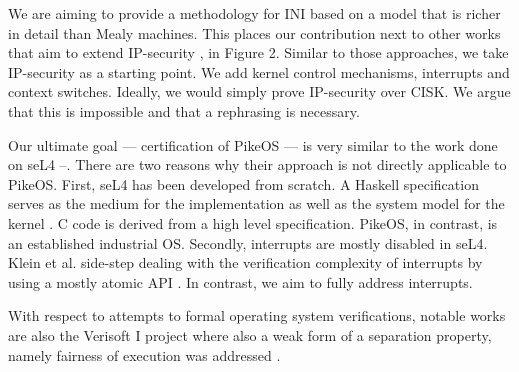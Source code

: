 \documentclass[11pt,a4paper]{article}
\begin{document}
We are aiming to provide a methodology for INI based on a model that is richer 
in detail than Mealy machines. This places our contribution next to other works 
that aim to extend IP-security \cite{SKIPaper25}, \cite{SKIPaper31} in Figure 2. Similar to those 
approaches, we take IP-security as a starting point. We add kernel control 
mechanisms, interrupts and context switches. Ideally, we would simply prove 
IP-security over CISK. We argue that this is impossible and that a rephrasing 
is necessary.


Our ultimate goal --- certification of PikeOS --- is very similar to the work done 
on seL4 \cite{Murray_MBGK_12}–\cite{SKIPaper30}. There are two reasons why their 
approach is not directly applicable to PikeOS. First, seL4 has been developed 
from scratch. A Haskell specification serves as the medium for the implementation 
as well as the system model for the kernel \cite{Elphinstone:2007:TPV:1361397.1361417}. 
C code is derived from a high level specification. 
PikeOS, in contrast, is an established industrial OS. Secondly, interrupts are 
mostly disabled in seL4. Klein et al. side-step dealing with the verification 
complexity of interrupts by using a mostly atomic API \cite{Klein:2009:SFV:1629575.1629596}. 
In contrast, we  aim to fully address interrupts.

With respect to attempts to formal operating system verifications,
notable works are also the Verisoft I project \cite{DBLP:journals/jar/AlkassarHLSST09}
where also a weak form of a separation property, namely fairness of execution
was addressed \cite{DBLP:journals/jar/DaumDW09}.
\end{document}
